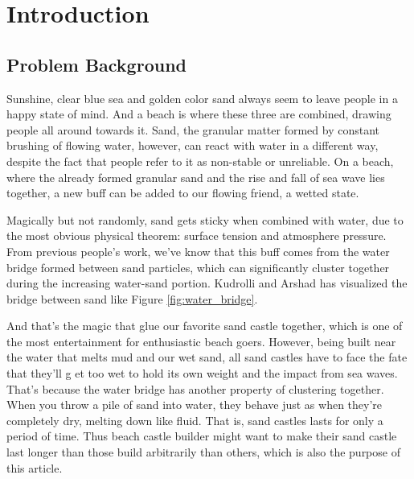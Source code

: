 \documentclass[12pt]{article}
\begin{document}
\tableofcontents
\newpage
\setcounter{page}{1}

\section{Introduction}
\subsection{Problem Background}
\par
Sunshine, clear blue sea and golden color sand always seem to leave people in a happy state of mind.
And a beach is where these three are combined, drawing people all around towards it. Sand, the granular matter formed by constant brushing of flowing water, however, can react with water in a different way, despite the fact that people refer to it as non-stable or unreliable. On a beach, where the already formed granular sand and the rise and fall of sea wave lies together, a new buff can be added to our flowing friend, a wetted state.
\par
Magically but not randomly, sand gets sticky when combined with water, due to the most obvious physical theorem: surface tension and atmosphere pressure. From previous people's work, we've know that this buff comes from the water bridge formed between sand particles, which can significantly cluster together during the increasing water-sand portion\autocite{pakpour2012construct,mitarai2006wet,kudrolli2008sticky}. Kudrolli and Arshad has visualized the bridge between sand like Figure \ref{fig:water_bridge}.
\par
And that's the magic that glue our favorite sand castle together, which is one of the most entertainment for enthusiastic beach goers. However, being built near the water that melts mud and our wet sand, all sand castles have to face the fate that they'll g et too wet to hold its own weight and the impact from sea waves. That's because the water bridge has another property of clustering together\autocite{kudrolli2008sticky}. When you throw a pile of sand into water, they behave just as when they're completely dry, melting down like fluid. That is, sand castles lasts for only a period of time. Thus beach castle builder might want to make their sand castle last longer than those build arbitrarily than others, which is also the purpose of this article.
\end{document}
